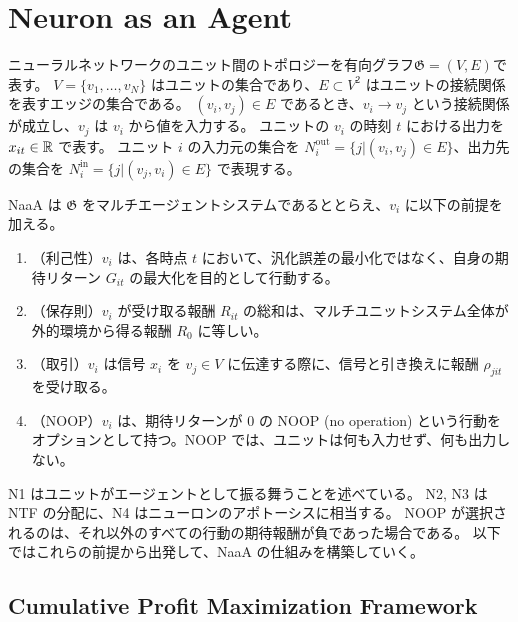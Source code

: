 \section{Neuron as an Agent}
ニューラルネットワークのユニット間のトポロジーを有向グラフ$\mathfrak{G} = (V, E)$で表す。
$V = \{v_1, \dots, v_N\}$ はユニットの集合であり、$E \subset V^2$ はユニットの接続関係を表すエッジの集合である。
$(v_i, v_j) \in E$ であるとき、$v_i \rightarrow v_j$ という接続関係が成立し、$v_j$ は $v_i$ から値を入力する。
ユニットの $v_i$ の時刻 $t$ における出力を $x_{it} \in \mathbb{R}$ で表す。
ユニット $i$ の入力元の集合を $N^\mathrm{out}_i = \{j | (v_i, v_j) \in E \}$、出力先の集合を $N^\mathrm{in}_i = \{j | (v_j, v_i) \in E \}$ で表現する。

NaaA は $\mathfrak{G}$ をマルチエージェントシステムであるととらえ、$v_i$ に以下の前提を加える。
\begin{enumerate}
\renewcommand{\labelenumi}{N\arabic{enumi}:}
\item （利己性）$v_i$ は、各時点 $t$ において、汎化誤差の最小化ではなく、自身の期待リターン $G_{it}$ の最大化を目的として行動する。
\item （保存則）$v_i$ が受け取る報酬 $R_{it}$ の総和は、マルチユニットシステム全体が外的環境から得る報酬 $R_0$ に等しい。
\item （取引）$v_i$ は信号 $x_i$ を $v_j \in V$ に伝達する際に、信号と引き換えに報酬 $\rho_{jit}$ を受け取る。
\item （NOOP）$v_i$ は、期待リターンが 0 の NOOP (no operation) という行動をオプションとして持つ。NOOP では、ユニットは何も入力せず、何も出力しない。
\end{enumerate}
N1 はユニットがエージェントとして振る舞うことを述べている。
N2, N3 は NTF の分配に、N4 はニューロンのアポトーシスに相当する。
NOOP が選択されるのは、それ以外のすべての行動の期待報酬が負であった場合である。
以下ではこれらの前提から出発して、NaaA の仕組みを構築していく。

\subsection{Cumulative Profit Maximization Framework}
%

